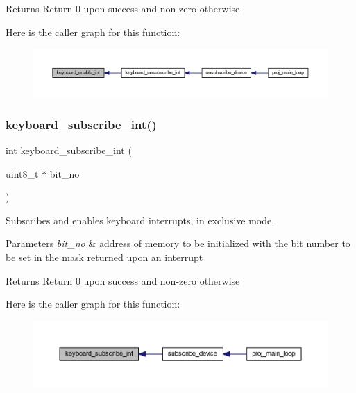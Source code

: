 \begin{DoxyReturn}{Returns}
Return 0 upon success and non-\/zero otherwise 
\end{DoxyReturn}
Here is the caller graph for this function\+:\nopagebreak
\begin{figure}[H]
\begin{center}
\leavevmode
\includegraphics[width=350pt]{group__keyboard_gaeb94e69ca92a37bc52ec381aa3ea5c70_icgraph}
\end{center}
\end{figure}
\mbox{\label{group__keyboard_ga8eee4d0a15beada731a514481b5ad4bf}} 
\subsubsection{\texorpdfstring{keyboard\+\_\+subscribe\+\_\+int()}{keyboard\_subscribe\_int()}}
{\footnotesize\ttfamily int keyboard\+\_\+subscribe\+\_\+int (\begin{DoxyParamCaption}\item[{uint8\+\_\+t $\ast$}]{bit\+\_\+no }\end{DoxyParamCaption})}



Subscribes and enables keyboard interrupts, in exclusive mode. 


\begin{DoxyParams}{Parameters}
{\em bit\+\_\+no} & address of memory to be initialized with the bit number to be set in the mask returned upon an interrupt \\
\hline
\end{DoxyParams}
\begin{DoxyReturn}{Returns}
Return 0 upon success and non-\/zero otherwise 
\end{DoxyReturn}
Here is the caller graph for this function\+:\nopagebreak
\begin{figure}[H]
\begin{center}
\leavevmode
\includegraphics[width=350pt]{group__keyboard_ga8eee4d0a15beada731a514481b5ad4bf_icgraph}
\end{center}
\end{figure}
\mbox{\label{group__keyboard_gac95aea27a5e91b363b876fed881f368f}} 
